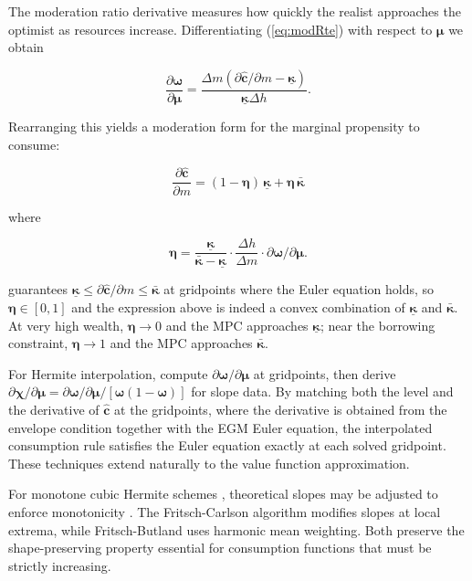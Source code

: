 \documentclass[preprint,authoryear]{elsarticle}
\newcommand{\mNrm}{m}
\newcommand{\hNrm}{h}
\newcommand{\cFunc}{\mathbf{c}}
\newcommand{\MPC}{\boldsymbol{\kappa}}
\newcommand{\MPCmin}{\underline{\MPC}}
\newcommand{\mNrmEx}{\Delta \mNrm}
\newcommand{\hNrmEx}{\Delta \hNrm}
\newcommand{\cFuncReal}{\hat{\cFunc}}
\newcommand{\modRte}{\boldsymbol{\omega}}
\newcommand{\logmNrmEx}{\boldsymbol{\mu}}
\newcommand{\logitModRte}{\boldsymbol{\chi}}
\newcommand{\MPCmax}{\bar{\MPC}}
\newcommand{\MPCmod}{\boldsymbol{\eta}}
\newcommand{\modRteMu}{\partial \modRte / \partial \logmNrmEx}
\newcommand{\logitModRteMu}{\partial \logitModRte / \partial \logmNrmEx}
\begin{document}
The moderation ratio derivative measures how quickly the realist approaches the optimist as resources increase.  Differentiating (\ref{eq:modRte}) with respect to $\logmNrmEx$ we obtain

\begin{equation}
\label{eq:modRteMu}
\frac{\partial \modRte}{\partial \logmNrmEx} = \frac{\mNrmEx (\partial \cFuncReal/\partial \mNrm - \MPCmin)}{\MPCmin \hNrmEx}.
\end{equation}

Rearranging this yields a moderation form for the marginal propensity to consume:

\begin{equation}
\label{eq:MPCModeration}
\frac{\partial \cFuncReal}{\partial \mNrm} = (1-\MPCmod)\,\MPCmin + \MPCmod\,\MPCmax
\end{equation}

where

\begin{equation}
\label{eq:MPCModerationWeight}
\MPCmod = \frac{\MPCmin}{\MPCmax-\MPCmin} \cdot \frac{\hNrmEx}{\mNrmEx} \cdot \partial \modRte / \partial \logmNrmEx.
\end{equation}

\citet{CarrollShanker2024} guarantees $\MPCmin \leq \partial \cFuncReal/\partial \mNrm \leq \MPCmax$ at gridpoints where the Euler equation holds, so $\MPCmod \in [0,1]$ and the expression above is indeed a convex combination of $\MPCmin$ and $\MPCmax$. At very high wealth, $\MPCmod \to 0$ and the MPC approaches $\MPCmin$; near the borrowing constraint, $\MPCmod \to 1$ and the MPC approaches $\MPCmax$.

For Hermite interpolation, compute $\modRteMu$ at gridpoints, then derive $\logitModRteMu = \modRteMu/[\modRte(1 -\modRte)]$ for slope data. By matching both the level and the derivative of $\cFuncReal$ at the gridpoints, where the derivative is obtained from the envelope condition \citep{BenvenisteScheinkman1979, MilgromSegal2002} together with the EGM Euler equation, the interpolated consumption rule satisfies the Euler equation exactly at each solved gridpoint. These techniques extend naturally to the value function approximation.

For monotone cubic Hermite schemes \citep{Fritsch1980, FritschButland1984, deBoor2001}, theoretical slopes may be adjusted to enforce monotonicity \citep{Hyman1983}. The Fritsch-Carlson algorithm modifies slopes at local extrema, while Fritsch-Butland uses harmonic mean weighting. Both preserve the shape-preserving property essential for consumption functions that must be strictly increasing.
\end{document}
